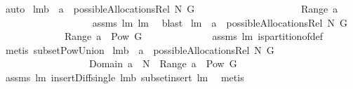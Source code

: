 \begin{isabellebody}
\ auto%
\endisatagproof
{\isafoldproof}%
%
\isadelimproof
\isanewline
%
\endisadelimproof
\isanewline
{}\isamarkupfalse%
\ lm{}{}b{\isacharcolon}\ \ {\isachardoublequoteopen}a\ {\isasymin}\ possibleAllocationsRel\ N\ G{\isachardoublequoteclose}\ \isanewline
\ \ \ \ \ \ \ \ \ \ \ \ \ \ \ \ \ \ {\isachardoublequoteopen}{\isacharbraceleft}{\isacharbraceright}\ {\isasymnotin}\ Range\ a{\isachardoublequoteclose}\ \isanewline
%
\isadelimproof
\ \ \ \ \ \ \ \ \ \ \ \ \ \ \ \ \ %
\endisadelimproof
%
\isatagproof
{}\isamarkupfalse%
\ assms\ lm{}{}\ lm{}{}\ \isamarkupfalse%
\ blast%
\endisatagproof
{\isafoldproof}%
%
\isadelimproof
\isanewline
%
\endisadelimproof
\isanewline
{}\isamarkupfalse%
\ lm{}{}{\isacharcolon}\ \ {\isachardoublequoteopen}a\ {\isasymin}\ possibleAllocationsRel\ N\ G{\isachardoublequoteclose}\ \isanewline
\ \ \ \ \ \ \ \ \ \ \ \ \ {\isachardoublequoteopen}Range\ a\ {\isasymsubseteq}\ Pow\ G{\isachardoublequoteclose}\isanewline
%
\isadelimproof
\ \ \ \ \ \ \ \ \ \ \ \ %
\endisadelimproof
%
\isatagproof
{}\isamarkupfalse%
\ assms\ lm{}{}\ is{\isacharunderscore}partition{\isacharunderscore}of{\isacharunderscore}def\ \isamarkupfalse%
\ {\isacharparenleft}metis\ subset{\isacharunderscore}Pow{\isacharunderscore}Union{\isacharparenright}%
\endisatagproof
{\isafoldproof}%
%
\isadelimproof
\isanewline
%
\endisadelimproof
\isanewline
{}\isamarkupfalse%
\ lm{}{}b{\isacharcolon}\ \ {\isachardoublequoteopen}a\ {\isasymin}\ possibleAllocationsRel\ N\ G{\isachardoublequoteclose}\ \isanewline
\ \ \ \ \ \ \ \ \ \ \ \ \ \ \ \ \ \ {\isachardoublequoteopen}Domain\ a\ {\isasymsubseteq}\ N\ {\isacharampersand}\ Range\ a\ {\isasymsubseteq}\ Pow\ G\ {\isacharminus}\ {\isacharbraceleft}{\isacharbraceleft}{\isacharbraceright}{\isacharbraceright}{\isachardoublequoteclose}\ \isanewline
%
\isadelimproof
\ \ \ \ \ \ \ \ \ \ \ \ \ \ \ \ \ %
\endisadelimproof
%
\isatagproof
{}\isamarkupfalse%
\ assms\ lm{}{}\ insert{\isacharunderscore}Diff{\isacharunderscore}single\ lm{}{}b\ subset{\isacharunderscore}insert\ lm{}{}\ \isamarkupfalse%
\ metis%
\endisatagproof
{\isafoldproof}%
%
\isadelimproof
\isanewline
%

\end{isabellebody}
